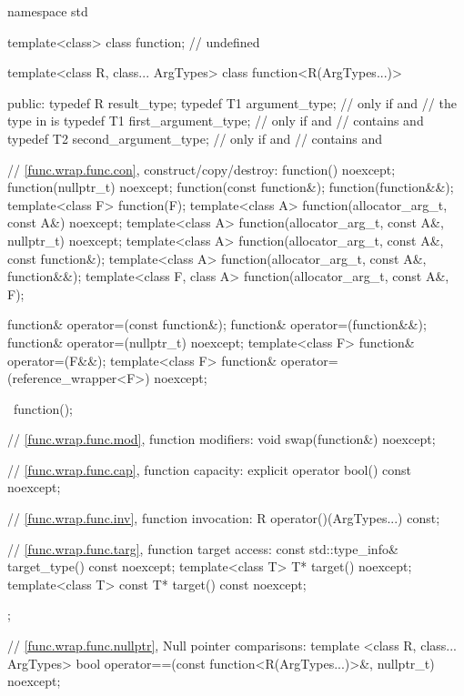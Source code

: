 \begin{codeblock}
namespace std {
  template<class> class function; // undefined

  template<class R, class... ArgTypes>
  class function<R(ArgTypes...)> {
  public:
    typedef R result_type;
    typedef T1 argument_type;           // only if  and
                                        // the type in  is 
    typedef T1 first_argument_type;     // only if  and
                                        //  contains  and 
    typedef T2 second_argument_type;    // only if  and
                                        //  contains  and 

    // \ref{func.wrap.func.con}, construct/copy/destroy:
    function() noexcept;
    function(nullptr_t) noexcept;
    function(const function&);
    function(function&&);
    template<class F> function(F);
    template<class A> function(allocator_arg_t, const A&) noexcept;
    template<class A> function(allocator_arg_t, const A&,
      nullptr_t) noexcept;
    template<class A> function(allocator_arg_t, const A&,
      const function&);
    template<class A> function(allocator_arg_t, const A&,
      function&&);
    template<class F, class A> function(allocator_arg_t, const A&, F);

    function& operator=(const function&);
    function& operator=(function&&);
    function& operator=(nullptr_t) noexcept;
    template<class F> function& operator=(F&&);
    template<class F> function& operator=(reference_wrapper<F>) noexcept;

    ~function();

    // \ref{func.wrap.func.mod}, function modifiers:
    void swap(function&) noexcept;

    // \ref{func.wrap.func.cap}, function capacity:
    explicit operator bool() const noexcept;

    // \ref{func.wrap.func.inv}, function invocation:
    R operator()(ArgTypes...) const;

    // \ref{func.wrap.func.targ}, function target access:
    const std::type_info& target_type() const noexcept;
    template<class T>       T* target() noexcept;
    template<class T> const T* target() const noexcept;

  };

  // \ref{func.wrap.func.nullptr}, Null pointer comparisons:
  template <class R, class... ArgTypes>
    bool operator==(const function<R(ArgTypes...)>&, nullptr_t) noexcept;

}
\end{codeblock}
